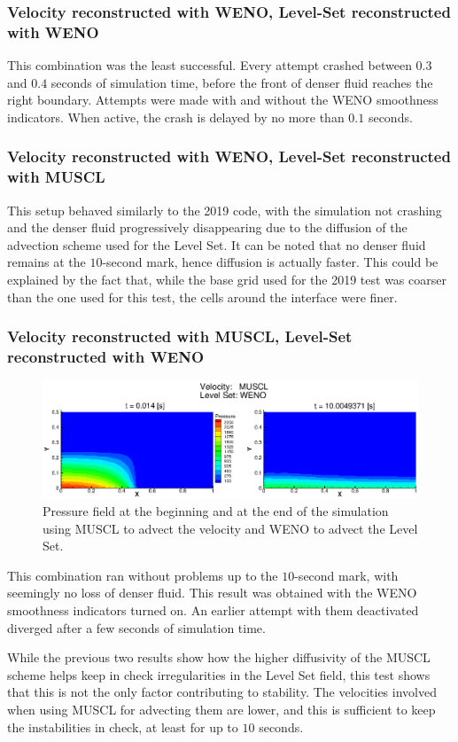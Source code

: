 \documentclass[11pt, a4paper, oneside, openany]{book}
\begin{document}
\subsubsection{Velocity reconstructed with WENO, Level-Set reconstructed with WENO}
This combination was the least successful. Every attempt crashed between $0.3$ and $0.4$ seconds of simulation time, before the front of denser fluid reaches the right boundary. Attempts were made with and without the WENO smoothness indicators. When active, the crash is delayed by no more than $0.1$ seconds.
\subsubsection{Velocity reconstructed with WENO, Level-Set reconstructed with MUSCL}
This setup behaved similarly to the 2019 code, with the simulation not crashing and the denser fluid progressively disappearing due to the diffusion of the advection scheme used for the Level Set. It can be noted that no denser fluid remains at the $10$-second mark, hence diffusion is actually faster. This could be explained by the fact that, while the base grid used for the 2019 test was coarser than the one used for this test, the cells around the interface were finer. 
\subsubsection{Velocity reconstructed with MUSCL, Level-Set reconstructed with WENO}
\begin{figure}[!ht]
	\centering
	\includegraphics[width=1\textwidth]{dambreak2020_V_MUSCL_LS_WENO_Pressure.eps}
	\caption[Dambreak 2020 MUSCL - WENO Pressure field]{Pressure field at the beginning and at the end of the simulation using MUSCL to advect the velocity and WENO to advect the Level Set.}\label{dambreak2020_V_MUSCL_LS_WENO_Pressure}
\end{figure}\noindent
This combination ran without problems up to the $10$-second mark, with seemingly no loss of denser fluid. This result was obtained with the WENO smoothness indicators turned on. An earlier attempt with them deactivated diverged after a few seconds of simulation time.\par
While the previous two results show how the higher diffusivity of the MUSCL scheme helps keep in check irregularities in the Level Set field, this test shows that this is not the only factor contributing to stability. The velocities involved when using MUSCL for advecting them are lower, and this is sufficient to keep the instabilities in check, at least for up to $10$ seconds.
\end{document}
